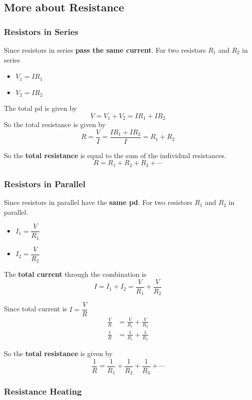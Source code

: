 \subsection{More about Resistance}

\subsubsection*{Resistors in Series}

Since resistors in series \textbf{pass the same current}. For two resistors $R_1$ and $R_2$ in series
\begin{itemize}
    \item $V_1=IR_1$
    \item $V_2=IR_2$
\end{itemize}
The total pd is given by
$$V=V_1+V_2=IR_1+IR_2$$
So the total resistance is given by
$$R=\frac{V}{I}=\frac{IR_1+IR_2}{I}=R_1+R_2$$

So the \textbf{total resistance} is equal to the sum of the individual resistances.
$$R=R_1+R_2+R_3+\cdots$$

\subsubsection*{Resistors in Parallel}

Since resistors in parallel have the \textbf{same pd}. For two resistors $R_1$ and $R_2$ in parallel.
\begin{itemize}
    \item $I_1=\dfrac{V}{R_1}$
    \item $I_2=\dfrac{V}{R_2}$
\end{itemize}

The \textbf{total current} through the combination is
$$I=I_1+I_2=\frac{V}{R_1}+\frac{V}{R_2}$$

Since total current is $I=\dfrac{V}{R}$
\begin{align*}
    \frac{V}{R}&=\frac{V}{R_1}+\frac{V}{R_2}\\
    \frac{1}{R}&=\frac{1}{R_1}+\frac{1}{R_2}
\end{align*}

So the \textbf{total resistance} is given by
$$\frac{1}{R}=\frac{1}{R_1}+\frac{1}{R_2}+\frac{1}{R_3}+\cdots$$

\subsubsection*{Resistance Heating}

